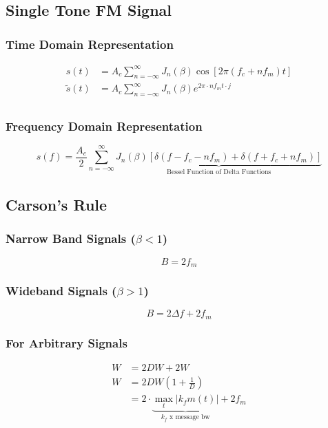 \documentclass[10pt]{article}
\begin{document}
\subsection{Single Tone FM Signal}
\subsubsection{Time Domain Representation}
\begin{align*}
	s(t)         & = A_c \sum_{n=-\infty}^{\infty}  J_n(\beta)\cos\left[2 \pi (f_c + n f_m) t\right] \\
	\tilde{s}(t) & = A_c \sum_{n=-\infty}^{\infty} J_n(\beta) e^{2 \pi \cdot n f_m t \cdot j}        \\
\end{align*}
\subsubsection{Frequency Domain Representation}
\[
	s(f) = \frac{A_c}{2} \sum_{n=-\infty}^{\infty} \underbrace{J_n(\beta)\left[\delta(f-f_c-n f_m) + \delta(f+f_c+n f_m)\right]}_{\text{Bessel Function of Delta Functions}}
\]

\subsection{Carson's Rule}
\subsubsection{Narrow Band Signals ($\beta < 1$)}
\[
	B = 2 f_m
\]

\subsubsection{Wideband Signals ($\beta > 1$)}
\[
	B = 2 \Delta f + 2 f_m
\]
\subsubsection{For Arbitrary Signals}
\begin{align*}
	W & = 2 D W + 2 W                                                                            \\
	W & = 2DW(1 + \frac{1}{D})                                                                   \\
	  & = 2 \cdot \underbrace{\max_{t}\left|k_f m(t)\right|}_{\text{$k_f$ x message bw}} + 2 f_m
\end{align*}
\end{document}
